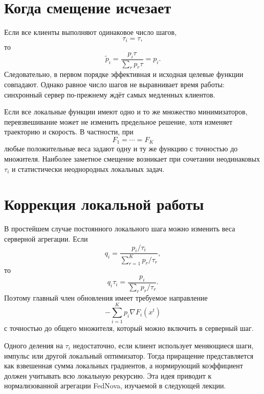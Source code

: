 \section{Когда смещение исчезает}

Если все клиенты выполняют одинаковое число шагов,
\[
    \tau_i=\tau,
\]
то
\[
    \widetilde p_i
    =
    \frac{p_i\tau}{\sum_r p_r\tau}
    =p_i.
\]
Следовательно, в первом порядке эффективная и исходная целевые
функции совпадают. Однако равное число шагов не выравнивает время
работы: синхронный сервер по-прежнему ждёт самых медленных клиентов.

Если все локальные функции имеют одно и то же множество минимизаторов,
перевзвешивание может не изменить предельное решение, хотя изменяет
траекторию и скорость. В частности, при
\[
    F_1=\cdots=F_K
\]
любые положительные веса задают одну и ту же функцию с точностью до
множителя. Наиболее заметное смещение возникает при сочетании
неодинаковых \(\tau_i\) и статистически неоднородных локальных задач.

\section{Коррекция локальной работы}

В простейшем случае постоянного локального шага можно изменить веса
серверной агрегации. Если
\[
    q_i
    =
    \frac{p_i/\tau_i}{\sum_{r=1}^{K}p_r/\tau_r},
\]
то
\[
    q_i\tau_i
    =
    \frac{p_i}{\sum_r p_r/\tau_r}.
\]
Поэтому главный член обновления имеет требуемое направление
\[
    -\sum_{i=1}^{K}p_i\nabla F_i(x^t)
\]
с точностью до общего множителя, который можно включить в серверный
шаг.

Одного деления на \(\tau_i\) недостаточно, если клиент использует
меняющиеся шаги, импульс или другой локальный оптимизатор. Тогда
приращение представляется как взвешенная сумма локальных градиентов,
а нормирующий коэффициент должен учитывать всю локальную рекурсию.
Эта идея приводит к нормализованной агрегации FedNova, изучаемой в
следующей лекции.
